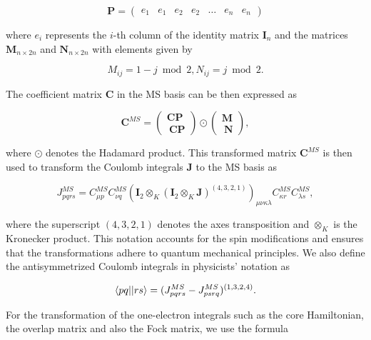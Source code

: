 \documentclass[open=any,parskip=half,11pt]{scrbook}
\begin{document}
\begin{equation}
\mathbf{P}=\begin{pmatrix}e_1&e_1&e_2&e_2&\dots&e_n&e_n\end{pmatrix}
\end{equation}

where \(e_i\) represents the \(i\)-th column of the identity matrix \(\mathbf{I}_n\) and the matrices \(\mathbf{M}_{n\times 2n}\) and \(\mathbf{N}_{n\times 2n}\) with elements given by

\begin{equation}
M_{ij}=1-j\bmod 2,N_{ij}=j \bmod 2.
\end{equation}

The coefficient matrix \(\mathbf{C}\) in the MS basis can be then expressed as

\begin{equation}
\mathbf{C}^{MS}=\begin{pmatrix}\mathbf{CP}\\\ \mathbf{CP}\end{pmatrix}\odot\begin{pmatrix}\mathbf{M}\\\ \mathbf{N}\end{pmatrix},
\end{equation}

where \(\odot\) denotes the Hadamard product. This transformed matrix \(\mathbf{C}^{MS}\) is then used to transform the Coulomb integrals \(\mathbf{J}\) to the MS basis as

\begin{equation}
J_{pqrs}^{MS}=C_{\mu p}^{MS}C_{\nu q}^{MS}(\mathbf{I}_{2}\otimes_K(\mathbf{I}_{2}\otimes_K\mathbf{J})^{(4,3,2,1)})_{\mu\nu\kappa\lambda}C_{\kappa r}^{MS}C_{\lambda s}^{MS},
\end{equation}

where the superscript \((4,3,2,1)\) denotes the axes transposition and \(\otimes_K\) is the Kronecker product. This notation accounts for the spin modifications and ensures that the transformations adhere to quantum mechanical principles. We also define the antisymmetrized Coulomb integrals in physicists' notation as

\begin{equation}
\braket{pq||rs}=(J_{pqrs}^{MS}-J_{psrq}^{MS})^{(1,3,2,4)}.
\end{equation}

For the transformation of the one-electron integrals such as the core Hamiltonian, the overlap matrix and also the Fock matrix, we use the formula
\end{document}
